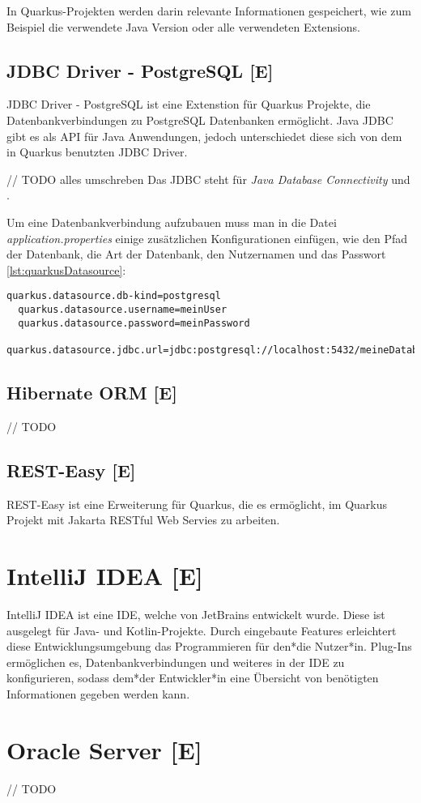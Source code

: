 In Quarkus-Projekten werden darin relevante Informationen gespeichert, wie zum Beispiel die verwendete Java Version oder alle verwendeten Extensions.
\

\subsection{JDBC Driver - PostgreSQL [E]}
JDBC Driver - PostgreSQL ist eine Extenstion für Quarkus Projekte, die Datenbankverbindungen zu PostgreSQL Datenbanken ermöglicht.
Java JDBC gibt es als API für Java Anwendungen, jedoch unterschiedet diese sich von dem in Quarkus benutzten JDBC Driver.

// TODO alles umschreben
Das JDBC steht für \emph{Java Database Connectivity} und .

Um eine Datenbankverbindung aufzubauen muss man in die Datei \emph{application.properties} einige zusätzlichen Konfigurationen einfügen, wie den Pfad der Datenbank, die Art der Datenbank, den Nutzernamen und das Passwort \ref{lst:quarkusDatasource}:

\begin{lstlisting}[caption=Beispielkonfigurationen,label=lst:quarkusDatasource]
  quarkus.datasource.db-kind=postgresql 
  quarkus.datasource.username=meinUser
  quarkus.datasource.password=meinPassword
  quarkus.datasource.jdbc.url=jdbc:postgresql://localhost:5432/meineDatabase
\end{lstlisting}

\subsection{Hibernate ORM [E]}
// TODO

\subsection{REST-Easy [E]}
REST-Easy ist eine Erweiterung für Quarkus, die es ermöglicht, im Quarkus Projekt mit Jakarta RESTful Web Servies zu arbeiten. 


\section{IntelliJ IDEA [E]}
IntelliJ IDEA ist eine IDE, welche von JetBrains entwickelt wurde. Diese ist ausgelegt für Java- und Kotlin-Projekte. 
Durch eingebaute Features erleichtert diese Entwicklungsumgebung das Programmieren für den*die Nutzer*in. 
Plug-Ins ermöglichen es, Datenbankverbindungen und weiteres in der IDE zu konfigurieren, sodass dem*der Entwickler*in eine Übersicht von benötigten Informationen gegeben werden kann.
\cite{IntelliJIDEA}

\section{Oracle Server [E]}
// TODO